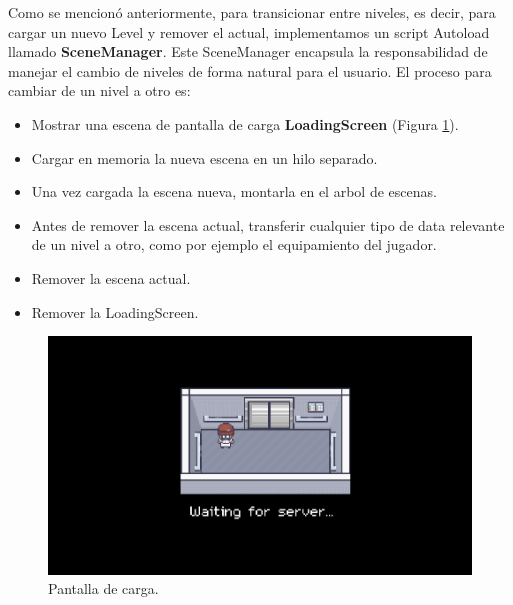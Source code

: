Como se mencionó anteriormente, para transicionar entre niveles, es decir, para cargar un nuevo Level
y remover el actual, implementamos un script Autoload llamado \textbf{SceneManager}.
Este SceneManager encapsula la responsabilidad de manejar el cambio de niveles de forma natural para 
el usuario. El proceso para cambiar de un nivel a otro es:

\begin{itemize}
    \item Mostrar una escena de pantalla de carga \textbf{LoadingScreen} (Figura \ref{fig:loading-screen}).
    \item Cargar en memoria la nueva escena en un hilo separado.
    \item Una vez cargada la escena nueva, montarla en el arbol de escenas.
    \item Antes de remover la escena actual, transferir cualquier tipo de data relevante de un nivel a otro,
    como por ejemplo el equipamiento del jugador.
    \item Remover la escena actual.
    \item Remover la LoadingScreen.
\end{itemize}

\begin{figure}[htbp]
    \centering
    \includegraphics[width=1.0\textwidth]{../assets/godot-loading-screen.png}
    \caption{Pantalla de carga.}
    \label{fig:loading-screen}
\end{figure}


